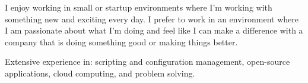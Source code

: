 \par{
I enjoy working in small or startup environments where I'm working with
something new and exciting every day.  I prefer to work in an environment where
I am passionate about what I'm doing and feel like I can make a difference with 
a company that is doing something good or making things better.
}

\par{
Extensive experience in: scripting and configuration management, open-source
applications, cloud computing, and problem solving.
}
